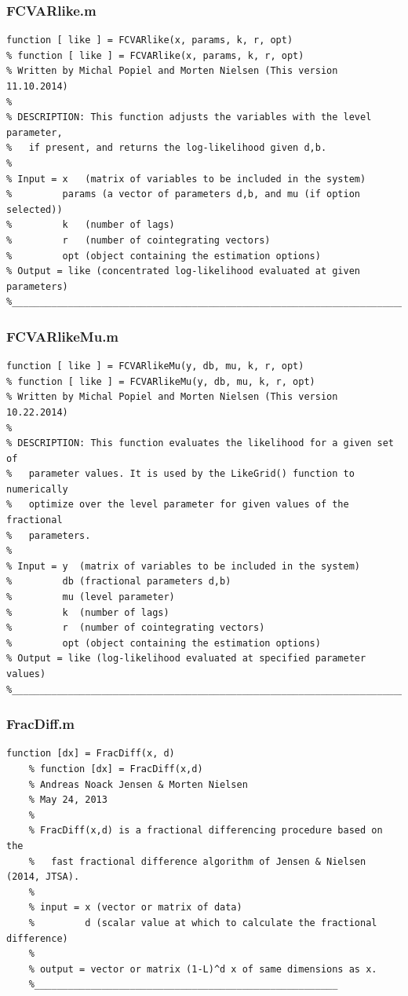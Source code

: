 \documentclass[10pt]{article}
\begin{document}
\subsubsection{FCVARlike.m}
\begin{lstlisting}[frame=single,caption={FCVARlike.m}]
function [ like ] = FCVARlike(x, params, k, r, opt)
% function [ like ] = FCVARlike(x, params, k, r, opt)
% Written by Michal Popiel and Morten Nielsen (This version 11.10.2014)
% 
% DESCRIPTION: This function adjusts the variables with the level parameter,
% 	if present, and returns the log-likelihood given d,b.
%
% Input = x   (matrix of variables to be included in the system)
%         params (a vector of parameters d,b, and mu (if option selected))
%         k   (number of lags)
%         r   (number of cointegrating vectors)
%         opt (object containing the estimation options)
% Output = like (concentrated log-likelihood evaluated at given parameters)
%_________________________________________________________________________
\end{lstlisting}

\subsubsection{FCVARlikeMu.m}
\begin{lstlisting}[frame=single,caption={FCVARlikeMu.m}]
function [ like ] = FCVARlikeMu(y, db, mu, k, r, opt)
% function [ like ] = FCVARlikeMu(y, db, mu, k, r, opt)
% Written by Michal Popiel and Morten Nielsen (This version 10.22.2014)
% 
% DESCRIPTION: This function evaluates the likelihood for a given set of
% 	parameter values. It is used by the LikeGrid() function to numerically
% 	optimize over the level parameter for given values of the fractional
% 	parameters.
%
% Input = y  (matrix of variables to be included in the system)
%         db (fractional parameters d,b)
%         mu (level parameter)
%         k  (number of lags)
%         r  (number of cointegrating vectors)
%         opt (object containing the estimation options)
% Output = like (log-likelihood evaluated at specified parameter values)
%_________________________________________________________________________
\end{lstlisting}


\subsubsection{FracDiff.m}
\begin{lstlisting}[frame=single,caption={FracDiff.m}]
function [dx] = FracDiff(x, d)
    % function [dx] = FracDiff(x,d)
    % Andreas Noack Jensen & Morten Nielsen
    % May 24, 2013
    %
    % FracDiff(x,d) is a fractional differencing procedure based on the
    % 	fast fractional difference algorithm of Jensen & Nielsen (2014, JTSA).
    %
    % input = x (vector or matrix of data)
    %         d (scalar value at which to calculate the fractional difference)
    % 
    % output = vector or matrix (1-L)^d x of same dimensions as x.
    %______________________________________________________
\end{lstlisting}
\end{document}

